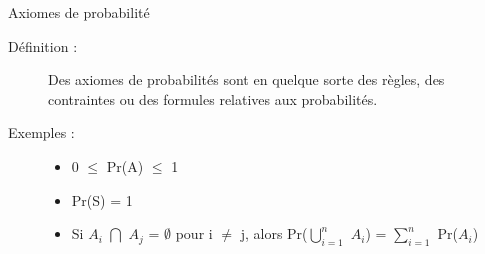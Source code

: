 \documentclass[10pt, french]{article}
\begin{document}
\begin{multicols*}{3}
\begin{axioms}{Axiomes de probabilité}
\begin{description}
  \item[Définition :] Des axiomes de probabilités sont en quelque sorte des règles, des contraintes ou des formules relatives aux probabilités.
  \item[Exemples :]
  \begin{itemize}
  \item 0 $\le$ Pr(A) $\le$ 1
  \item Pr(S) = 1
  \item Si $A_i$ $\bigcap$ $A_j$ = $\emptyset$ pour i $\neq$ j, alors Pr($\bigcup_{i = 1}^{n}$ $A_i$) = $\sum_{i = 1}^{n}$ Pr($A_i$)
  \end{itemize}
\end{description}
\end{axioms}

\pagebreak

\end{multicols*}
\end{document}
